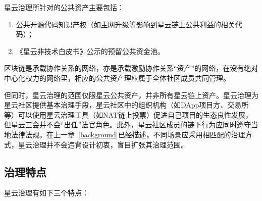 星云治理所针对的公共资产主要包括：

\begin{enumerate}
	\item 公共开源代码知识产权（如主网升级等影响到星云链上公共利益的相关代码）；
	\item 《星云非技术白皮书》公示的预留公共资金池。
\end{enumerate}

区块链是承载协作关系的网络，亦是承载激励协作关系“资产”的网络，在没有绝对中心化权力的网络里，相应的公共资产理应属于全体社区成员共同管理。

但同时，星云治理的范围仅限星云公共资产，并非所有星云链上资产。星云治理为星云社区提供基本治理手段，星云社区中的组织机构（如DApp项目方、交易所等）可以使用星云治理工具（如NAT链上投票）促进自己项目的生态良性发展，但星云三会并不会“出任”法官角色。此外，星云社区成员的链下行为应同时遵守当地法律法规。在上一章~\ref{background}已经描述，不同场景应采用相匹配的治理方式，星云治理并不会违背设计初衷，盲目扩张其治理范围。

\subsection{治理特点}

星云治理有如下三个特点：

